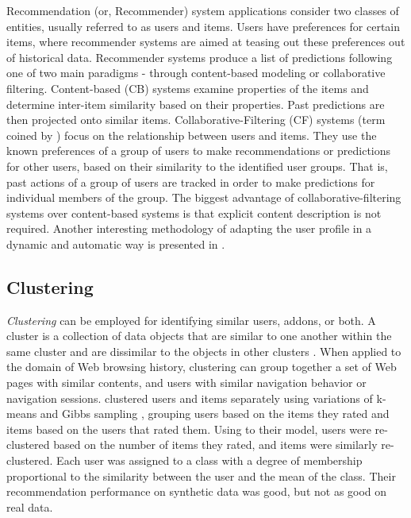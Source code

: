 \documentclass[ijoc,nonblindrev]{informs3} %
\numberwithin{equation}{subsection}
\begin{document}
Recommendation (or, Recommender) system applications \citep{resnick1997recommender} consider two
classes of entities, usually referred to as users and items. Users have preferences for certain items, where recommender systems are
aimed at teasing out these preferences out of historical data. Recommender systems produce a list of predictions following one of two main paradigms -
through content-based modeling or collaborative filtering. 
Content-based (CB) systems examine properties of the items and determine inter-item similarity based on their properties. 
Past predictions are then projected onto similar items.
Collaborative-Filtering (CF) systems (term coined by \cite{goldberg1992using}) focus on the relationship between users and items. 
They use the known preferences of a group of users to make recommendations or predictions for other users, based on their similarity to the identified user groups. 
That is, past actions of a group of users are tracked in order to make predictions for individual members of the group.
The biggest advantage of collaborative-filtering systems over content-based systems is that explicit content description is not required. 
Another interesting methodology of adapting the user profile in a dynamic and automatic way is presented in \cite{marin2013dynamic}.

\subsection{Clustering}

\emph{Clustering} can be employed for identifying similar users, addons, or both. A cluster is a collection of data objects that are similar to
one another within the same cluster and are dissimilar to the objects in other clusters \citep{han2006data}.
When applied to the domain of Web browsing history, clustering can group together a set of Web pages with similar
contents, and users with similar navigation behavior or navigation sessions.
\cite{ungar1998clustering} clustered users and items separately using variations of k-means and Gibbs sampling \citep{geman1984stochastic}, grouping users
based on the items they rated and items based on the users that rated them. Using to their model, users were re-clustered based on the
number of items they rated, and items were similarly re-clustered. Each user was assigned to a class with a degree of
membership proportional to the similarity between the user and the mean of the class. Their recommendation performance on synthetic data
was good, but not as good on real data. 
\end{document}
